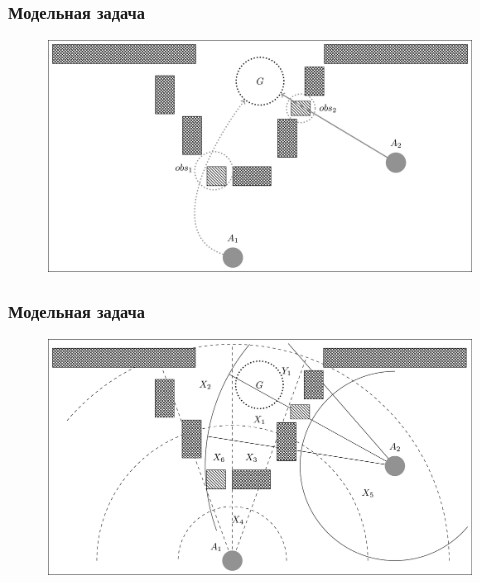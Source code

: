 \documentclass[default]{beamer}
\begin{document}
	\begin{frame}
		\frametitle{Модельная задача}
		
		\begin{figure}
			\includegraphics[width=\textwidth]{strl/rita_example.png}
		\end{figure}
	\end{frame}

	\begin{frame}
		\frametitle{Модельная задача}
		
		\begin{figure}
			\includegraphics[width=\textwidth]{strl/rita_ex_proc.png}
		\end{figure}
	\end{frame}
\end{document}
